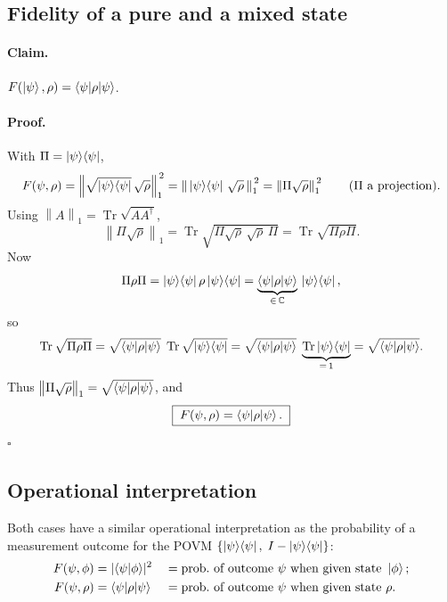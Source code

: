 \documentclass[11pt]{article}
\newcommand{\Tr}{\operatorname{Tr}}
\newcommand{\onenorm}[1]{\left\lVert #1 \right\rVert_{1}}
\newcommand{\C}{\mathbb{C}}
\begin{document}
\subsection{Fidelity of a pure and a mixed state}

\paragraph{Claim.}
$F(\ket{\psi},\rho) = \braket{\psi|\rho|\psi}$.

\paragraph{Proof.}
With $\Pi=\ket{\psi}\!\bra{\psi}$,
\[
F(\psi,\rho)
= \onenorm{\sqrt{\ket{\psi}\!\bra{\psi}}\,\sqrt{\rho}}^{\,2}
= \onenorm{\,\ket{\psi}\!\bra{\psi}\,\sqrt{\rho}\,}^{\,2}
= \onenorm{\Pi\sqrt{\rho}}^{\,2}
\qquad(\Pi\text{ a projection}).
\]
Using $\onenorm{A}=\Tr\sqrt{AA^{\dagger}}$,
\[
\onenorm{\Pi\sqrt{\rho}}
= \Tr\sqrt{\Pi\sqrt{\rho}\,\sqrt{\rho}\,\Pi}
= \Tr\sqrt{\Pi\rho\Pi}.
\]
Now
\[
\Pi\rho\Pi = \ket{\psi}\!\bra{\psi}\rho\ket{\psi}\!\bra{\psi}
= \underbrace{\braket{\psi|\rho|\psi}}_{\in\,\C}\,\ket{\psi}\!\bra{\psi},
\]
so
\[
\Tr\sqrt{\Pi\rho\Pi}
= \sqrt{\braket{\psi|\rho|\psi}}\;\Tr\sqrt{\ket{\psi}\!\bra{\psi}}
= \sqrt{\braket{\psi|\rho|\psi}}\;\underbrace{\Tr\ket{\psi}\!\bra{\psi}}_{=\,1}
= \sqrt{\braket{\psi|\rho|\psi}}.
\]
Thus $\onenorm{\Pi\sqrt{\rho}} = \sqrt{\braket{\psi|\rho|\psi}}$, and
\[
\boxed{\; F(\psi,\rho) = \braket{\psi|\rho|\psi}. \;}
\]
\hfill$\square$

\subsection{Operational interpretation}

Both cases have a similar operational interpretation as the probability of a
measurement outcome for the POVM $\{\ket{\psi}\!\bra{\psi},\; I-\ket{\psi}\!\bra{\psi}\}$:
\[
\begin{aligned}
F(\psi,\phi) &= |\!\braket{\psi|\phi}\!|^{2}
&&= \text{prob.\ of outcome } \psi \text{ when given state } \ket{\phi};\\
F(\psi,\rho) &= \braket{\psi|\rho|\psi}
&&= \text{prob.\ of outcome } \psi \text{ when given state } \rho.
\end{aligned}
\]
\end{document}
